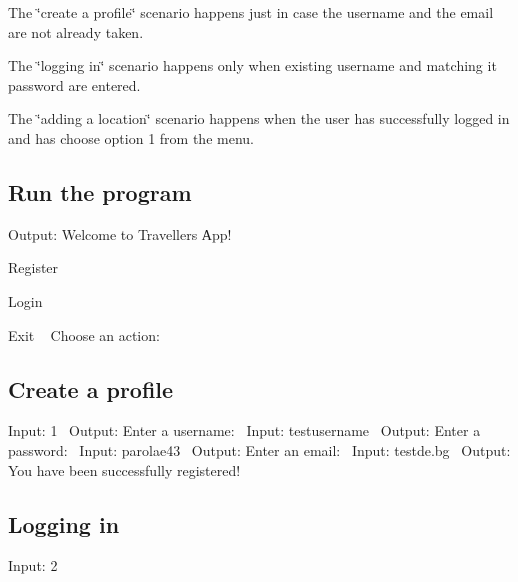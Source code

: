 \begin{DoxyItemize}
\item The \char`\"{}create a profile\char`\"{} scenario happens just in case the username and the email are not already taken. ~\newline

\item The \char`\"{}logging in\char`\"{} scenario happens only when existing username and matching it password are entered. ~\newline

\item The \char`\"{}adding a location\char`\"{} scenario happens when the user has successfully logged in and has choose option 1 from the menu.~\newline
 
\end{DoxyItemize}\hypertarget{index_running}{}\subsection{Run the program}\label{index_running}
Output\+: Welcome to Traveller\textquotesingle{}s Аpp!
\begin{DoxyEnumerate}
\item Register
\item Login
\item Exit ~\newline
 Choose an action\+: 
\end{DoxyEnumerate}\hypertarget{index_create}{}\subsection{Create a profile}\label{index_create}
Input\+: 1~\newline
 Output\+: Enter a username\+:~\newline
 Input\+: testusername~\newline
 Output\+: Enter a password\+:~\newline
 Input\+: parolae43~\newline
 Output\+: Enter an email\+:~\newline
 Input\+: testde.\+bg~\newline
 Output\+: You have been successfully registered!\hypertarget{index_login}{}\subsection{Logging in}\label{index_login}
Input\+: 2~\newline
